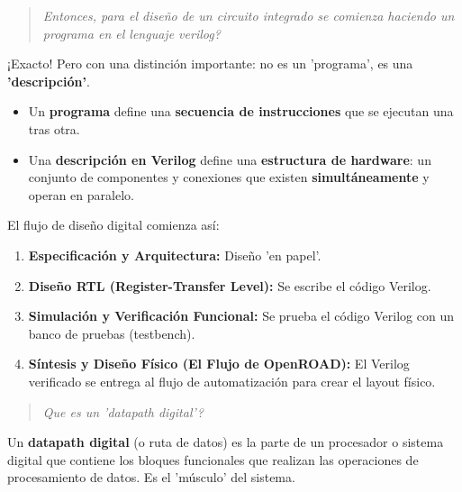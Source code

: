 \documentclass[12pt,a4paper]{article}
\newenvironment{pregunta}
  {\begin{leftbar}\begin{quote}\itshape}
  {\end{quote}\end{leftbar}}
\begin{document}
\begin{pregunta}
Entonces, para el diseño de un circuito integrado se comienza haciendo un programa en el lenguaje verilog?
\end{pregunta}

¡Exacto! Pero con una distinción importante: no es un 'programa', es una \textbf{'descripción'}.
\begin{itemize}
    \item Un \textbf{programa} define una \textbf{secuencia de instrucciones} que se ejecutan una tras otra.
    \item Una \textbf{descripción en Verilog} define una \textbf{estructura de hardware}: un conjunto de componentes y conexiones que existen \textbf{simultáneamente} y operan en paralelo.
\end{itemize}

El flujo de diseño digital comienza así:
\begin{enumerate}
    \item \textbf{Especificación y Arquitectura:} Diseño 'en papel'.
    \item \textbf{Diseño RTL (Register-Transfer Level):} Se escribe el código Verilog.
    \item \textbf{Simulación y Verificación Funcional:} Se prueba el código Verilog con un banco de pruebas (testbench).
    \item \textbf{Síntesis y Diseño Físico (El Flujo de OpenROAD):} El Verilog verificado se entrega al flujo de automatización para crear el layout físico.
\end{enumerate}

\begin{pregunta}
Que es un 'datapath digital'?
\end{pregunta}

Un \textbf{datapath digital} (o ruta de datos) es la parte de un procesador o sistema digital que contiene los bloques funcionales que realizan las operaciones de procesamiento de datos. Es el 'músculo' del sistema.
\end{document}
